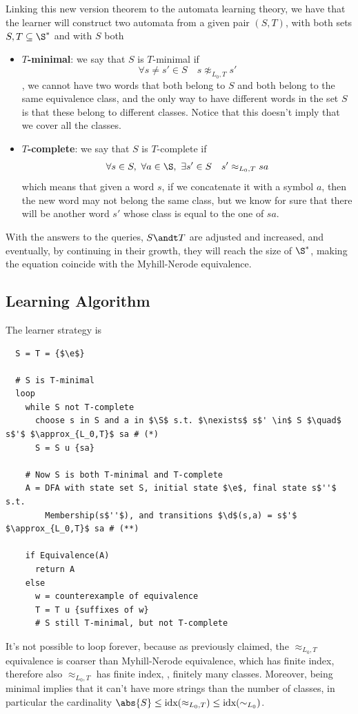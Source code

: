 \documentclass[oneside]{academica}
\begin{document}
\bigskip
Linking this new version theorem to the automata learning theory, we have that the learner will construct two automata from a given pair $(S,T)$, with both sets $S,T \subseteq \S^*$ and with $S$ both 
\begin{itemize}
  \item \textbf{$T$-minimal}: we say that $S$ is $T$-minimal if
    \begin{equation*}
      \forall s \neq s' \in S \quad s \not\approx_{L_0,T} s'
    \end{equation*}
    \ie, we cannot have two words that both belong to $S$ and both belong to the same equivalence class, and the only way to have different words in the set $S$ is that these belong to different classes.
    Notice that this doesn't imply that we cover all the classes.
  \item \textbf{$T$-complete}: we say that $S$ is $T$-complete if
    \begin{equation*}
      \forall s \in S,\ \forall a \in \S,\ \exists s' \in S \quad s' \approx_{L_0,T} sa
    \end{equation*}
    which means that given a word $s$, if we concatenate it with a symbol $a$, then the new word may not belong the same class, but we know for sure that there will be another word $s'$ whose class is equal to the one of $sa$.
\end{itemize}
With the answers to the queries, $S \andt T$ are adjusted and increased, and eventually, by continuing in their growth, they will reach the size of $\S^*$, making the equation coincide with the Myhill-Nerode equivalence.

\subsection{Learning Algorithm}

The learner strategy is
\begin{lstlisting}
  S = T = {$\e$}

  # S is T-minimal
  loop
    while S not T-complete
      choose s in S and a in $\S$ s.t. $\nexists$ s$' \in$ S $\quad$ s$'$ $\approx_{L_0,T}$ sa # (*)
      S = S u {sa}

    # Now S is both T-minimal and T-complete
    A = DFA with state set S, initial state $\e$, final state s$''$ s.t.
        Membership(s$''$), and transitions $\d$(s,a) = s$'$ $\approx_{L_0,T}$ sa # (**)

    if Equivalence(A)
      return A
    else
      w = counterexample of equivalence
      T = T u {suffixes of w}
      # S still T-minimal, but not T-complete
\end{lstlisting}
It's not possible to loop forever, because as previously claimed, the $\approx_{L_0,T}$ equivalence is coarser than Myhill-Nerode equivalence, which has finite index, therefore also $\approx_{L_0,T}$ has finite index, \ie, finitely many classes.
Moreover, being minimal implies that it can't have more strings than the number of classes, in particular the cardinality $\abs{S} \leq \text{idx}(\approx_{L_0,T}) \leq \text{idx}(\sim_{L_0})$.
\end{document}
